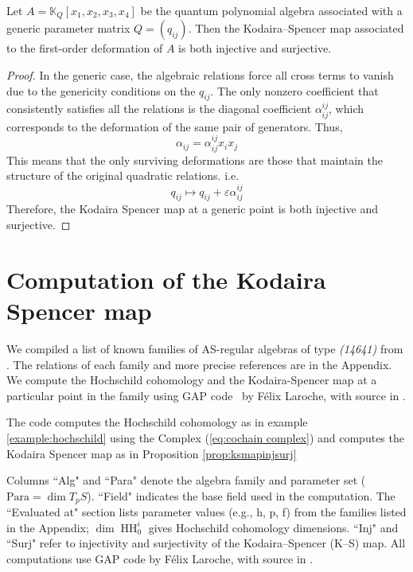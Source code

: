 \documentclass{amsart}
\def\HH{\operatorname{HH}}
\begin{document}
\begin{proposition} \label{prop:ksmapinjsurj}
Let \( A = \mathbb{K}_Q[x_1, x_2, x_3, x_4] \) be the quantum polynomial algebra associated with a generic parameter matrix \( Q = (q_{ij}) \). Then the Kodaira–Spencer map associated to the first-order deformation of \( A \) is both injective and surjective.   
\end{proposition}
\begin{proof}
In the generic case, the algebraic relations force all cross terms to vanish due to the genericity conditions on the \(q_{ij}\). The only nonzero coefficient that consistently satisfies all the relations is the diagonal coefficient \(\alpha_{ij}^{ij}\), which corresponds to the deformation of the same pair of generators.
Thus,
\[
\alpha_{ij} = \alpha_{ij}^{ij} x_i x_j
\]
This means that the only surviving deformations are those that maintain the structure of the original quadratic relations.
i.e.
\[q_{ij} \longmapsto q_{ij} + \varepsilon \alpha_{ij}^{ij}\]
Therefore, the Kodaira Spencer map at a generic point is both injective and surjective.
\end{proof}
\section{Computation of the Kodaira Spencer map}

We compiled a list of known families of AS-regular algebras of type \textit{(14641)} from \cite{Davies_2016,ExoticElliptic, grimley2016hochschild, Smith1992, VANCLIFF199463, 10.1112/jlms/jdp057, MR1429334, Pym2013PoissonSA, MR2529094, Jacobson}. The relations of each family and more precise references are in the Appendix. We compute the Hochschild cohomology and the Kodaira-Spencer map at a particular point in the family using GAP code~\cite{GAP4} by Félix Laroche, with source in \cite{dblp}.

The code computes the Hochschild cohomology as in example \ref{example:hochschild} using the Complex (\ref{eq:cochain complex})
and computes the Kodaira Spencer map as in Proposition \ref{prop:ksmapinjsurj}

Columns ``Alg" and ``Para" denote the algebra family and parameter set (\( \text{Para} = \dim T_p S \)). ``Field" indicates the base field used in the computation. The ``Evaluated at" section lists parameter values (e.g., h, p, f) from the families listed in the Appendix; $\dim \HH_0^i$ gives Hochschild cohomology dimensions. ``Inj" and ``Surj" refer to injectivity and surjectivity of the Kodaira–Spencer (K–S) map. All computations use GAP code \cite{GAP4} by Félix Laroche, with source in \cite{dblp}. 
\end{document}
